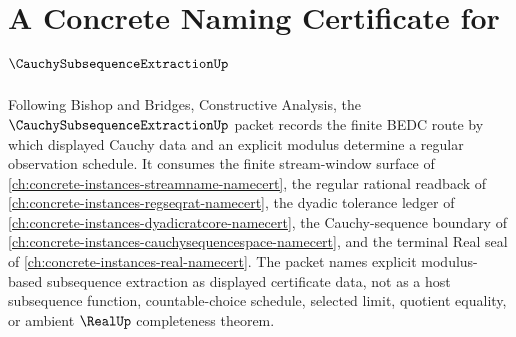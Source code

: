\chapter{A Concrete Naming Certificate for $\CauchySubsequenceExtractionUp$}
\label{ch:concrete-instances-cauchy-subsequence-extraction-namecert}

Following Bishop and Bridges, Constructive Analysis, the $\CauchySubsequenceExtractionUp$ packet records the finite BEDC route by which displayed Cauchy data and an explicit modulus determine a regular observation schedule. It consumes the finite stream-window surface of \autoref{ch:concrete-instances-streamname-namecert}, the regular rational readback of \autoref{ch:concrete-instances-regseqrat-namecert}, the dyadic tolerance ledger of \autoref{ch:concrete-instances-dyadicratcore-namecert}, the Cauchy-sequence boundary of \autoref{ch:concrete-instances-cauchysequencespace-namecert}, and the terminal Real seal of \autoref{ch:concrete-instances-real-namecert}. The packet names explicit modulus-based subsequence extraction as displayed certificate data, not as a host subsequence function, countable-choice schedule, selected limit, quotient equality, or ambient $\RealUp$ completeness theorem.

